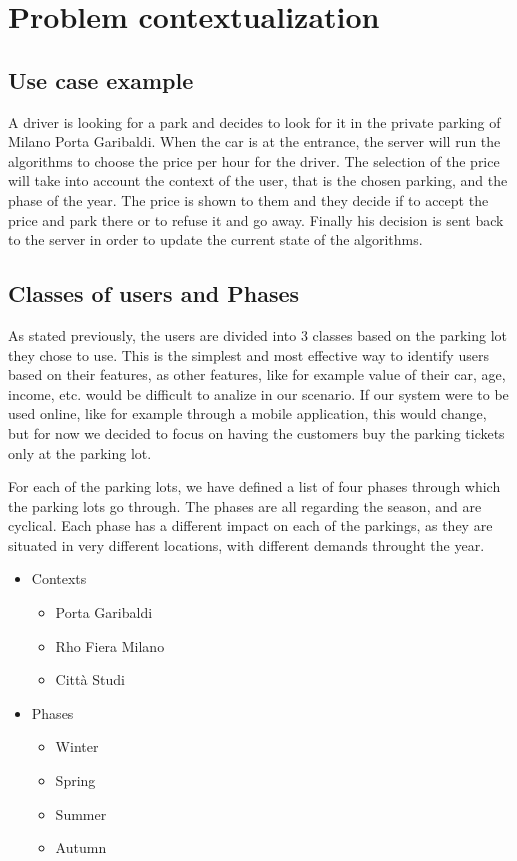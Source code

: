 \newpage
\section{Problem contextualization}\label{sec:problem-contextualization}
\subsection{Use case example}\label{subsec:use-case-example}



A driver is looking for a park and decides to look for it in the private parking of Milano Porta Garibaldi.
When the car is at the entrance, the server will run the algorithms to choose the price per hour for the driver.
The selection of the price will take into account the context of the user, that is the chosen parking, and the phase of the year.
The price is shown to them and they decide if to accept the price and park there or to refuse it and go away.
Finally his decision is sent back to the server in order to update the current state of the algorithms.


\subsection{Classes of users and Phases}\label{subsec:classes-of-users-and-phases}

As stated previously, the users are divided into 3 classes based on the parking lot they chose to use.
This is the simplest and most effective way to identify users based on their features, as other features,
like for example value of their car, age, income, etc. would be difficult to analize in our scenario.
If our system were to be used online, like for example through a mobile application, this would change,
but for now we decided to focus on having the customers buy the parking tickets only at the parking lot.

For each of the parking lots, we have defined a list of four phases through which the parking lots go through.
The phases are all regarding the season, and are cyclical.
Each phase has a different impact on each of the parkings, as they are situated in very different locations,
with different demands throught the year.


\begin{itemize}
	\item Contexts
	\begin{itemize}
		\item Porta Garibaldi
		\item Rho Fiera Milano
		\item Città Studi
	\end{itemize}
	\item Phases
	\begin{itemize}
		\item Winter
		\item Spring
		\item Summer
		\item Autumn
	\end{itemize}
\end{itemize}